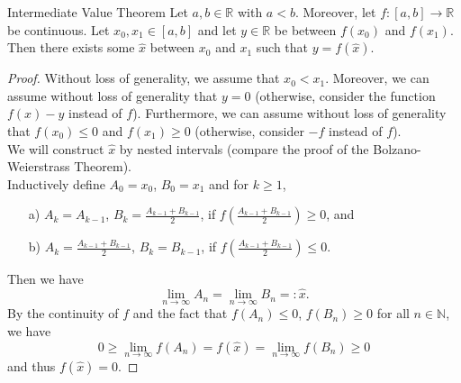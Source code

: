 

\begin{Theorem}{Intermediate Value Theorem}
Let $a,b\in\mathbb{R}$ with $a<b$. Moreover, let $f:[a,b]\to\mathbb{R}$ be continuous. Let $x_0,x_1\in [a,b]$ and let $y\in\mathbb{R}$ be between $f(x_0)$ and $f(x_1)$. Then there exists some $\hat{x}$ between $x_0$ and $x_1$ such that $y=f(\hat{x})$.
\end{Theorem}



\begin{proof}
Without loss of generality, we assume that $x_0<x_1$. Moreover, we can assume without loss of generality that $y=0$ (otherwise, consider the function $f(x)-y$ instead of $f$). Furthermore,
we can assume without loss of generality that $f(x_0)\leq0$ and $f(x_1)\geq0$ (otherwise, consider $-f$ instead of $f$).\\
We will construct $\hat{x}$ by nested intervals (compare the proof of the Bolzano-Weierstrass Theorem).\\
Inductively define $A_0=x_0$, $B_0=x_1$ and for $k\geq1$,
\begin{itemize}
 \item[a)] $A_k=A_{k-1}$, $B_k=\frac{A_{k-1}+B_{k-1}}2$, if $f(\frac{A_{k-1}+B_{k-1}}2)\geq0$, and
 \item[b)] $A_k=\frac{A_{k-1}+B_{k-1}}2$, $B_k=B_{k-1}$, if $f(\frac{A_{k-1}+B_{k-1}}2)\leq0$.
\end{itemize}
Then we have
\[\lim_{n\to\infty}A_n=\lim_{n\to\infty}B_n=:\hat{x}.\]
By the continuity of $f$ and the fact that $f(A_n)\leq0$, $f(B_n)\geq0$ for all $n\in\mathbb{N}$, we have
\[0\geq\lim_{n\to\infty}f(A_n)=f(\hat{x})=\lim_{n\to\infty}f(B_n)\geq0\]
and thus $f(\hat{x})=0$.
\end{proof}

